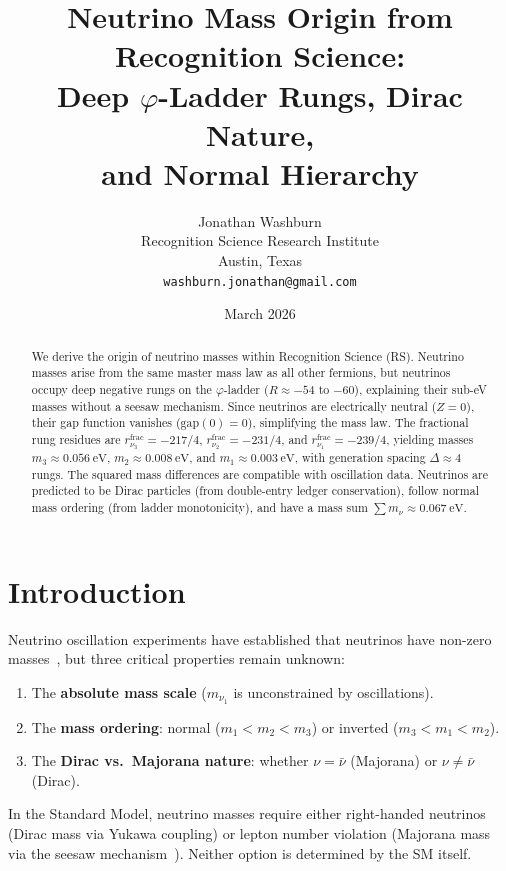 \documentclass[12pt,a4paper]{article}
\title{Neutrino Mass Origin from Recognition Science:\\
Deep $\varphi$-Ladder Rungs, Dirac Nature,\\
and Normal Hierarchy}
\author{Jonathan Washburn\\
Recognition Science Research Institute\\
Austin, Texas\\
\texttt{washburn.jonathan@gmail.com}}
\date{March 2026}
\theoremstyle{definition}
\theoremstyle{remark}
\begin{document}
\maketitle

\begin{abstract}
We derive the origin of neutrino masses within Recognition
Science (RS).  Neutrino masses arise from the same master mass
law as all other fermions, but neutrinos occupy deep negative
rungs on the $\varphi$-ladder ($R \approx -54$ to $-60$),
explaining their sub-eV masses without a seesaw mechanism.
Since neutrinos are electrically neutral ($Z = 0$), their gap
function vanishes ($\mathrm{gap}(0) = 0$), simplifying the
mass law.  The fractional rung residues are
$r_{\nu_3}^{\mathrm{frac}} = -217/4$,
$r_{\nu_2}^{\mathrm{frac}} = -231/4$, and
$r_{\nu_1}^{\mathrm{frac}} = -239/4$, yielding masses
$m_3 \approx 0.056~\mathrm{eV}$,
$m_2 \approx 0.008~\mathrm{eV}$, and
$m_1 \approx 0.003~\mathrm{eV}$, with generation spacing
$\Delta \approx 4$ rungs.  The squared mass differences are
compatible with oscillation data.  Neutrinos are predicted to
be Dirac particles (from double-entry ledger conservation),
follow normal mass ordering (from ladder monotonicity), and
have a mass sum $\sum m_\nu \approx 0.067~\mathrm{eV}$.
\end{abstract}

\section{Introduction}
\label{sec:intro}

Neutrino oscillation experiments have established that
neutrinos have non-zero masses~\cite{PDG2022}, but three
critical properties remain unknown:
\begin{enumerate}
  \item The \textbf{absolute mass scale}
  ($m_{\nu_1}$ is unconstrained by oscillations).
  \item The \textbf{mass ordering}: normal
  ($m_1 < m_2 < m_3$) or inverted ($m_3 < m_1 < m_2$).
  \item The \textbf{Dirac vs.\ Majorana nature}: whether
  $\nu = \bar{\nu}$ (Majorana) or $\nu \neq \bar{\nu}$
  (Dirac).
\end{enumerate}

In the Standard Model, neutrino masses require either
right-handed neutrinos (Dirac mass via Yukawa coupling) or
lepton number violation (Majorana mass via the seesaw
mechanism~\cite{Minkowski1977}).  Neither option is
determined by the SM itself.
\end{document}
